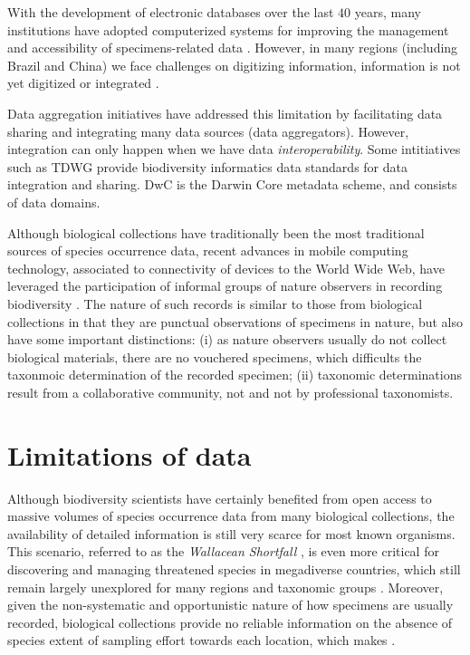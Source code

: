 With the development of electronic databases over the last $40$ years, many institutions have adopted computerized systems for improving the management and accessibility of specimens-related data \cite{Sunderland2013}.
However, in many regions (including Brazil and China) we face challenges on digitizing information, information is not yet digitized or integrated \cite{Meyer2016}.




Data aggregation initiatives have addressed this limitation by facilitating data sharing and integrating many data sources (data aggregators). %
However, integration can only happen when we have data \textit{interoperability}.
Some intitiatives such as TDWG provide biodiversity informatics data standards for data integration and sharing.
DwC is the Darwin Core metadata scheme, and consists of data domains. %


Although biological collections have traditionally been the most traditional sources of species occurrence data, recent advances in mobile computing technology, associated to connectivity of devices to the World Wide Web, have leveraged the participation of informal groups of nature observers in recording biodiversity \cite{Silvertown2009}.
The nature of such records is similar to those from biological collections in that they are punctual observations of specimens in nature, but also have some important distinctions: (i) as nature observers usually do not collect biological materials, there are no vouchered specimens, which difficults the taxonmoic determination of the recorded specimen; (ii) taxonomic determinations result from a collaborative community, not and not by professional taxonomists. 





\section{Limitations of data} %

Although biodiversity scientists have certainly benefited from open access to massive volumes of species occurrence data from many biological collections, the availability of detailed information is still very scarce for most known organisms.
This scenario, referred to as the \textit{Wallacean Shortfall} \cite{Lomolino2004}, is even more critical for discovering and managing threatened species in megadiverse countries, which still remain largely unexplored for many regions and taxonomic groups \cite{Soberon2004}.
%
Moreover, given the non-systematic and opportunistic nature of how specimens are usually recorded, biological collections provide no reliable information on the absence of species extent of sampling effort towards each location, which makes .

